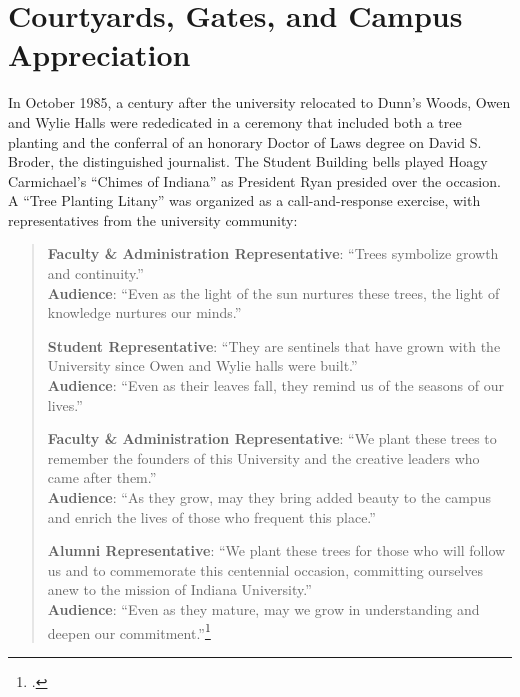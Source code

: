 \documentclass[
  american,
  letterpaper,
]{scrreprt}
\begin{document}
\section{Courtyards, Gates, and Campus
Appreciation}\label{courtyards-gates-and-campus-appreciation}

In October 1985, a century after the university relocated to Dunn's
Woods, Owen and Wylie Halls were rededicated in a ceremony that included
both a tree planting and the conferral of an honorary Doctor of Laws
degree on David S. Broder, the distinguished journalist. The Student
Building bells played Hoagy Carmichael's ``Chimes of Indiana'' as
President Ryan presided over the occasion. A ``Tree Planting Litany''
was organized as a call-and-response exercise, with representatives from
the university community:

\begin{quote}
\textbf{Faculty \& Administration Representative}: ``Trees symbolize
growth and continuity.''\\
\textbf{Audience}: ``Even as the light of the sun nurtures these trees,
the light of knowledge nurtures our minds.''

\textbf{Student Representative}: ``They are sentinels that have grown
with the University since Owen and Wylie halls were built.''\\
\textbf{Audience}: ``Even as their leaves fall, they remind us of the
seasons of our lives.''

\textbf{Faculty \& Administration Representative}: ``We plant these
trees to remember the founders of this University and the creative
leaders who came after them.''\\
\textbf{Audience}: ``As they grow, may they bring added beauty to the
campus and enrich the lives of those who frequent this place.''

\textbf{Alumni Representative}: ``We plant these trees for those who
will follow us and to commemorate this centennial occasion, committing
ourselves anew to the mission of Indiana University.''\\
\textbf{Audience}: ``Even as they mature, may we grow in understanding
and deepen our commitment.''\footnote{.}
\end{quote}
\end{document}
